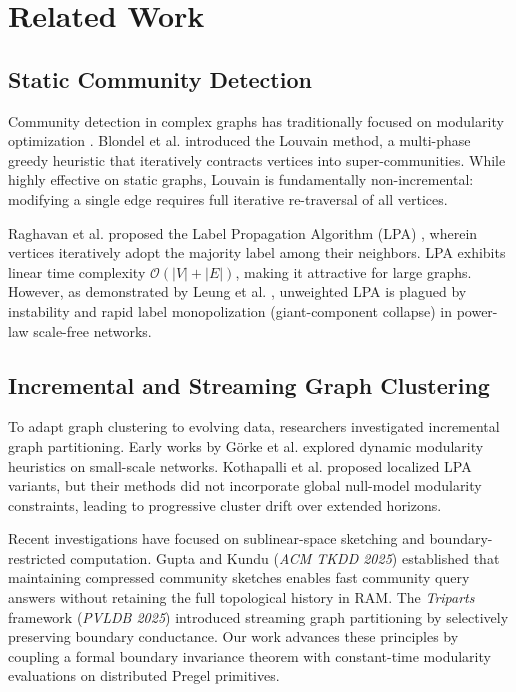 \documentclass[10pt,journal,compsoc]{IEEEtran}
\begin{document}
\section{Related Work}\label{sec:related_work}

\subsection{Static Community Detection}
Community detection in complex graphs has traditionally focused on modularity optimization \cite{newman2004finding, blondel2008fast}. Blondel et al. introduced the Louvain method, a multi-phase greedy heuristic that iteratively contracts vertices into super-communities. While highly effective on static graphs, Louvain is fundamentally non-incremental: modifying a single edge requires full iterative re-traversal of all vertices. 

Raghavan et al. proposed the Label Propagation Algorithm (LPA) \cite{raghavan2007near}, wherein vertices iteratively adopt the majority label among their neighbors. LPA exhibits linear time complexity $\mathcal{O}(|V| + |E|)$, making it attractive for large graphs. However, as demonstrated by Leung et al. \cite{leung2009towards}, unweighted LPA is plagued by instability and rapid label monopolization (giant-component collapse) in power-law scale-free networks.

\subsection{Incremental and Streaming Graph Clustering}
To adapt graph clustering to evolving data, researchers investigated incremental graph partitioning. Early works by Görke et al. \cite{gorke2013dynamic} explored dynamic modularity heuristics on small-scale networks. Kothapalli et al. \cite{kothapalli2013incremental} proposed localized LPA variants, but their methods did not incorporate global null-model modularity constraints, leading to progressive cluster drift over extended horizons.

Recent investigations have focused on sublinear-space sketching and boundary-restricted computation. Gupta and Kundu (\textit{ACM TKDD 2025}) \cite{gupta2025sublinear} established that maintaining compressed community sketches enables fast community query answers without retaining the full topological history in RAM. The \textit{Triparts} framework (\textit{PVLDB 2025}) \cite{triparts2025pvdldb} introduced streaming graph partitioning by selectively preserving boundary conductance. Our work advances these principles by coupling a formal boundary invariance theorem with constant-time modularity evaluations on distributed Pregel primitives.
\end{document}
